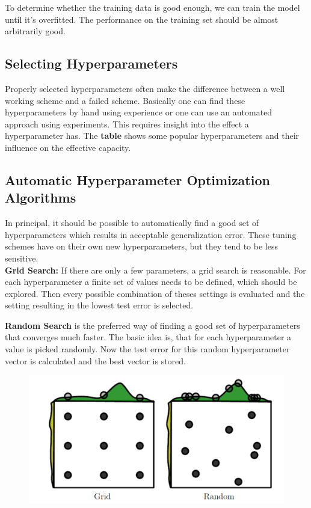 \begin{multicols}{2}
	To determine whether the training data is good enough, we can train the model until it's overfitted. The performance on the training set should be almost arbitrarily good.
	
	 
	\subsection{Selecting Hyperparameters}
	Properly selected hyperparameters often make the difference between a well working scheme and a failed scheme.
	Basically one can find these hyperparameters by hand using experience or one can use an automated approach using experiments.
	This requires insight into the effect a hyperparameter has. 
	The \textbf{table} shows some popular hyperparameters and their influence on the effective capacity.

	\subsection{Automatic Hyperparameter Optimization Algorithms}
	In principal, it should be possible to automatically find a good set of hyperparameters which results in acceptable generalization error.
	These tuning schemes have on their own new hyperparameters, but they tend to be less sensitive.\\
	
	\textbf{Grid Search: }If there are only a few parameters, a grid search is reasonable.
	For each hyperparameter a finite set of values needs to be defined, which should be explored.
	Then every possible combination of theses settings is evaluated and the setting resulting in the lowest test error is selected.
	
	\textbf{Random Search} is the preferred way of finding a good set of hyperparameters that converges much faster.
	The basic idea is, that for each hyperparameter a value is picked randomly.
	Now the test error for this random hyperparameter vector is calculated and the best vector is stored.
	
	\begin{figure}[H]
		\centering
		\includegraphics[width=0.75\linewidth]{images/gridrandom.PNG}
	\end{figure}
	

\end{multicols}
